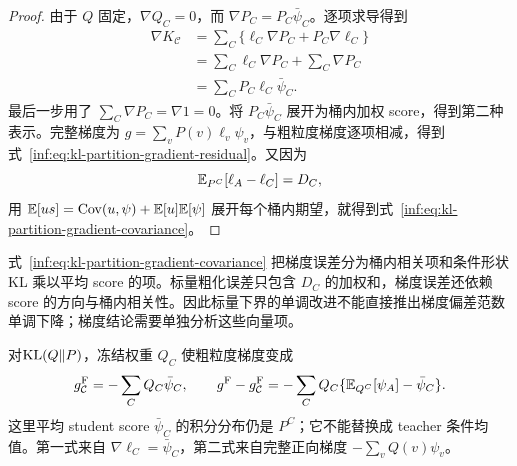 \begin{proof}
由于 $Q$ 固定，$\nabla Q_C=0$，而 $\nabla P_C=P_C\bar \psi_C$。逐项求导得到
\begin{align*}
 \nabla K_{\mathcal C}
 &=\sum_C\{\ell_C\nabla P_C+P_C\nabla\ell_C\}\\
 &=\sum_C\ell_C\nabla P_C+\sum_C\nabla P_C\\
 &=\sum_CP_C\ell_C\bar \psi_C.
\end{align*}
最后一步用了 $\sum_C\nabla P_C=\nabla1=0$。将 $P_C\bar \psi_C$ 展开为桶内加权 score，得到第二种表示。完整梯度为 $g=\sum_vP(v)\ell_v\psi_v$，与粗粒度梯度逐项相减，得到式~\eqref{inf:eq:kl-partition-gradient-residual}。又因为
\begin{equation*}
 \mathbb E_{P^C}[\ell_A-\ell_C]=D_C,
\end{equation*}
用 $\mathbb E[us]=\operatorname{Cov}(u,\psi)+\mathbb E[u]\mathbb E[\psi]$ 展开每个桶内期望，就得到式~\eqref{inf:eq:kl-partition-gradient-covariance}。
\end{proof}

式~\eqref{inf:eq:kl-partition-gradient-covariance} 把梯度误差分为桶内相关项和条件形状 KL 乘以平均 score 的项。标量粗化误差只包含 $D_C$ 的加权和，梯度误差还依赖 score 的方向与桶内相关性。因此标量下界的单调改进不能直接推出梯度偏差范数单调下降；梯度结论需要单独分析这些向量项。

对$\operatorname{KL}(Q\Vert P)$，冻结权重 $Q_C$ 使粗粒度梯度变成
\begin{equation*}
 g^{\mathrm F}_{\mathcal C}=-\sum_CQ_C\bar \psi_C,
 \qquad
 g^{\mathrm F}-g^{\mathrm F}_{\mathcal C}
 =-\sum_CQ_C\{\mathbb E_{Q^C}[\psi_A]-\bar \psi_C\}.
\end{equation*}
这里平均 student score $\bar \psi_C$ 的积分分布仍是 $P^C$；它不能替换成 teacher 条件均值。第一式来自 $\nabla\ell_C=\bar \psi_C$，第二式来自完整正向梯度 $-\sum_vQ(v)\psi_v$。
